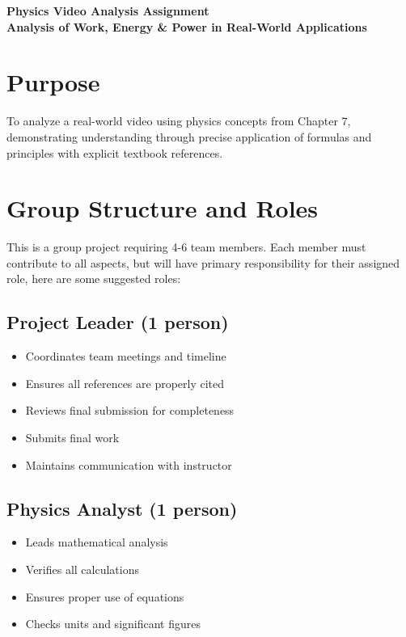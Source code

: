 \documentclass[12pt]{article}
\begin{document}
\begin{center}
{\LARGE\bfseries Physics Video Analysis Assignment\\[0.5cm]}
{\large\bfseries Analysis of Work, Energy \& Power in Real-World Applications}\\[1cm]
\end{center}

\section*{Purpose}
To analyze a real-world video using physics concepts from Chapter 7, demonstrating understanding through precise application of formulas and principles with explicit textbook references.

\section{Group Structure and Roles}
This is a group project requiring 4-6 team members. Each member must contribute to all aspects, but will have primary responsibility for their assigned role, here are some suggested roles:

\subsection{Project Leader (1 person)}
\begin{itemize}
\item Coordinates team meetings and timeline
\item Ensures all references are properly cited
\item Reviews final submission for completeness
\item Submits final work
\item Maintains communication with instructor
\end{itemize}

\subsection{Physics Analyst (1 person)}
\begin{itemize}
\item Leads mathematical analysis
\item Verifies all calculations
\item Ensures proper use of equations
\item Checks units and significant figures
\end{itemize}
\end{document}
